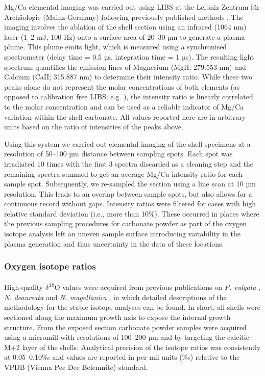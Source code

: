 \documentclass[
  authoryear,
  preprint,
  3p]{elsarticle}
\begin{document}
Mg/Ca elemental imaging was carried out using LIBS at the Leibniz
Zentrum für Archäologie (Mainz-Germany) following previously published
methods \citep{Hausmann2023-ih}. The imaging involves the ablation of
the shell section using an infrared (1064 nm) laser (1--2 mJ, 100 Hz)
onto a surface area of 20--30 µm to generate a plasma plume. This plume
emits light, which is measured using a synchronised spectrometer (delay
time = 0.5 µs, integration time = 1 µs). The resulting light spectrum
quantifies the emission lines of Magnesium (MgII; 279.553 nm) and
Calcium (CaII; 315.887 nm) to determine their intensity ratio. While
these two peaks alone do not represent the molar concentrations of both
elements (as opposed to calibration free LIBS; e.g.
\citep{Martinez-Minchero2022-jz}), the intensity ratio is linearly
correlated to the molar concentration \citep{Hausmann2017-oa} and can be
used as a reliable indicator of Mg/Ca variation within the shell
carbonate. All values reported here are in arbitrary units based on the
ratio of intensities of the peaks above.

Using this system we carried out elemental imaging of the shell
specimens at a resolution of 50--100 µm distance between sampling spots.
Each spot was irradiated 10 times with the first 3 spectra discarded as
a cleaning step and the remaining spectra summed to get an average Mg/Ca
intensity ratio for each sample spot. Subsequently, we re-sampled the
section using a line scan at 10 µm resolution. This leads to an overlap
between sample spots, but also allows for a continuous record without
gaps. Intensity ratios were filtered for cases with high relative
standard deviation (i.e., more than 10\%). These occurred in places
where the previous sampling procedures for carbonate powder as part of
the oxygen isotope analysis left an uneven sample surface introducing
variability in the plasma generation and thus uncertainty in the data of
these locations.

\subsubsection{Oxygen isotope ratios}\label{oxygen-isotope-ratios}

High-quality \(\delta\)\textsuperscript{18}O values were acquired from
previous publications on \emph{P. vulgata}
\citep{Surge2012-ba, Graniero2017-io}, \emph{N. deaureata} and \emph{N.
magellanica} \citep{Nicastro2020-ih}, in which detailed descriptions of
the methodology for the stable isotope analyses can be found. In short,
all shells were sectioned along the maximum growth axis to expose the
internal growth structure. From the exposed section carbonate powder
samples were acquired using a micromill with resolutions of 100--200 µm
and by targeting the calcitic M+2 layer of the shells. Analytical
precision of the isotope ratios was consistently at 0.05--0.10‰ and
values are reported in per mil units (‰) relative to the VPDB (Vienna
Pee Dee Belemnite) standard.
\end{document}
